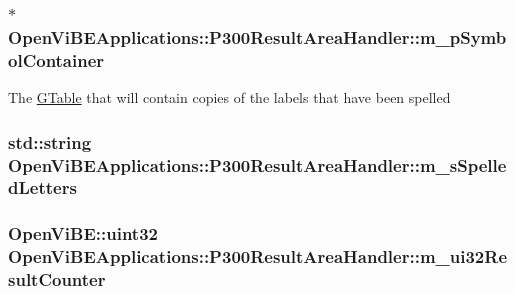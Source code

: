 \label{classOpenViBEApplications_1_1P300ResultAreaHandler_aec434a5928970e2b273f267f9ee696a4}
\hypertarget{classOpenViBEApplications_1_1P300ResultAreaHandler_a86b51c35dbd8f18f8dfe9fe19bfaeffd}{
\subsubsection[{m\_\-pSymbolContainer}]{$\ast$ {\bf OpenViBEApplications::P300ResultAreaHandler::m\_\-pSymbolContainer}}}
\label{classOpenViBEApplications_1_1P300ResultAreaHandler_a86b51c35dbd8f18f8dfe9fe19bfaeffd}
The \hyperlink{classOpenViBEApplications_1_1GTable}{GTable} that will contain copies of the labels that have been spelled \hypertarget{classOpenViBEApplications_1_1P300ResultAreaHandler_ae3147e0e80d2b5ab65887773af85c797}{
\subsubsection[{m\_\-sSpelledLetters}]{\setlength{\rightskip}{0pt plus 5cm}std::string {\bf OpenViBEApplications::P300ResultAreaHandler::m\_\-sSpelledLetters}}}
\label{classOpenViBEApplications_1_1P300ResultAreaHandler_ae3147e0e80d2b5ab65887773af85c797}
\hypertarget{classOpenViBEApplications_1_1P300ResultAreaHandler_a25f33b2c3dddf96cdee177cfefd13885}{
\subsubsection[{m\_\-ui32ResultCounter}]{\setlength{\rightskip}{0pt plus 5cm}OpenViBE::uint32 {\bf OpenViBEApplications::P300ResultAreaHandler::m\_\-ui32ResultCounter}}}
